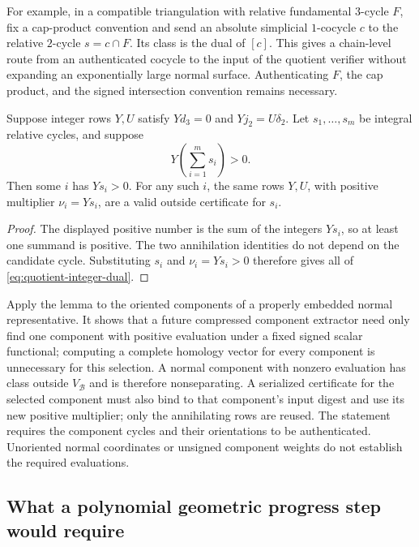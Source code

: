 For example, in a compatible triangulation with relative
fundamental $3$-cycle $F$, fix a cap-product convention and send
an absolute simplicial $1$-cocycle $c$ to the relative $2$-cycle
$s=c\cap F$. Its class is the dual of $[c]$. This gives a
chain-level route from an authenticated cocycle to the input
of the quotient verifier without expanding an exponentially
large normal surface. Authenticating $F$, the cap product, and
the signed intersection convention remains necessary.

\begin{lemma}
\label{lem:quotient-component}
Suppose integer rows $Y,U$ satisfy
$Yd_3=0$ and $Yj_2=U\delta_2$.
Let $s_1,\ldots,s_m$ be integral relative cycles, and suppose
\[
 Y\left(\sum_{i=1}^m s_i\right)>0.
\]
Then some $i$ has $Ys_i>0$. For any such $i$, the same rows $Y,U$,
with positive multiplier $\nu_i=Ys_i$, are a valid outside
certificate for $s_i$.
\end{lemma}

\begin{proof}
The displayed positive number is the sum of the integers $Ys_i$,
so at least one summand is positive. The two annihilation identities
do not depend on the candidate cycle. Substituting $s_i$ and
$\nu_i=Ys_i>0$ therefore gives all of
\eqref{eq:quotient-integer-dual}.
\end{proof}

Apply the lemma to the oriented components of a properly embedded
normal representative. It shows that a future compressed component
extractor need only find one component with positive evaluation
under a fixed signed scalar functional; computing a complete
homology vector for every component is unnecessary for this
selection. A normal component with nonzero evaluation has class
outside $V_{\mathcal B}$ and is therefore nonseparating.
A serialized certificate for the selected component must also bind to that component's input digest and use its new positive multiplier; only the annihilating rows are reused. The statement requires the component cycles and their orientations
to be authenticated. Unoriented normal coordinates or unsigned
component weights do not establish the required evaluations.

\subsection{What a polynomial geometric progress step would require}

